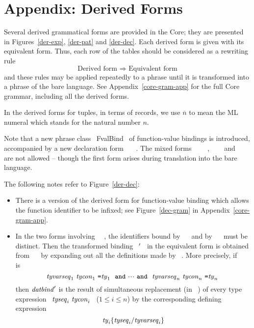 \section{Appendix: Derived Forms}
\label{derived-forms-app}
Several derived grammatical forms are provided in the Core; they are presented
in Figures~\ref{der-exp}, \ref{der-pat} and \ref{der-dec}. Each derived form is
given with its equivalent form. Thus, each row of the tables should be
considered as a rewriting rule
\[ \mbox{Derived form \ $\Longrightarrow$\  Equivalent form} \]
and these rules may be applied repeatedly to a phrase until it is transformed
into a phrase of the bare language.
See Appendix~\ref{core-gram-app} for the full Core grammar, including all the
derived forms.

In the derived forms for tuples, in terms of records, we use $\overline{n}$ to
mean the ML numeral which stands for the natural number $n$.

Note that a new phrase class ~FvalBind~ of function-value bindings is introduced,
accompanied by a new declaration form ~\FUN\ \insertion{\theexplicittyvars}{\tyvarseq\ }\fvalbind~. The mixed forms
~\VAL\ \insertion{\theexplicittyvars}{\tyvarseq\ }\REC\ \fvalbind~, ~\VAL\ \insertion{\theexplicittyvars}{\tyvarseq\ }\fvalbind~ and ~\FUN\ \insertion{\theexplicittyvars}{\tyvarseq\ }\valbind~ are not
allowed -- though the first form arises during translation into the bare
language.

The following notes refer to Figure~\ref{der-dec}:
\begin{itemize}
\item      There is a version of the derived form for function-value binding
	   which allows the function identifier to be infixed;
	   see Figure~\ref{dec-gram} in Appendix~\ref{core-gram-app}.
\item      In the two forms involving ~\WITHTYPE~, the identifiers bound
           by ~\datbind~ and by ~\typbind~ must be distinct. Then the
           transformed binding ~\datbind$\/'$~ in the equivalent form is
           obtained from ~\datbind~ by expanding out all the definitions
           made by ~\typbind.  More precisely, if ~\typbind~ is
           \[ \tyvarseq_1\ \tycon_1\ \mbox{\ml{=}} \ty_1\ \ \AND
              \ \cdots\ \AND
            \ \ \tyvarseq_n\ \tycon_n\ \mbox{\ml{=}} \ty_n\ \]
           then $\hbox{{\it datbind\/}}'$ is the result of simultaneous replacement
           (in ~\datbind) of every type expression ~${\it tyseq}_i\ {\it tycon}_i$~
           ($1\leq i\leq n$)
           by the corresponding defining expression
           \[  {\it ty}_i\{{\it tyseq}_i/{\it tyvarseq}_i\}\]
\end{itemize}

